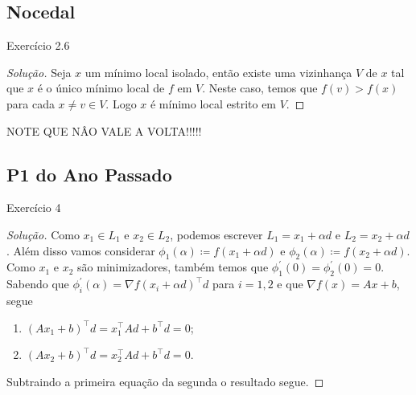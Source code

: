 \documentclass[12pt,twoside,a4paper]{article}
\begin{document}
\subsection{Nocedal}
\begin{problema}
  Exercício 2.6
\end{problema}
\begin{proof}[Solução]
Seja \(x\) um mínimo local isolado, então existe uma vizinhança \(V\) de \(x\)
tal que \(x\) é o único mínimo local de \(f\) em \(V\). Neste caso, temos que
\(f(v)>f(x)\) para cada \(x\not = v\in V\). Logo \(x\) é mínimo local estrito em \(V\).  
\end{proof}
NOTE QUE NÂO VALE A VOLTA!!!!!

\subsection{P1 do Ano Passado}
\begin{problema}
  Exercício 4
\end{problema}
\begin{proof}[Solução]
Como \(x_1\in L_1\) e \(x_2\in L_2\), podemos escrever \(L_1=x_1+\alpha d\) e
\(L_2=x_2+\alpha d\). Além disso vamos considerar \(\phi_1(\alpha)\coloneqq
f(x_1+\alpha d)\) e \(\phi_2(\alpha)\coloneqq f(x_2+\alpha d)\). Como \(x_1\) e
\(x_2\) são minimizadores, também temos que
\(\phi_1^\prime(0)=\phi_2^\prime(0)=0.\) Sabendo que
\(\phi_i^\prime(\alpha)=\nabla f(x_i+\alpha d)^\top d\) para \(i=1,2\) e que
\(\nabla f(x)=Ax+b\), segue
\begin{enumerate}
\item \((Ax_1+b)^\top d= x_1^\top Ad +b^\top d = 0\);
\item \((Ax_2+b)^\top d= x_2^\top Ad+ b^\top d = 0\).  
\end{enumerate}

Subtraindo a primeira equação da segunda o resultado segue.

\end{proof}
\end{document}
